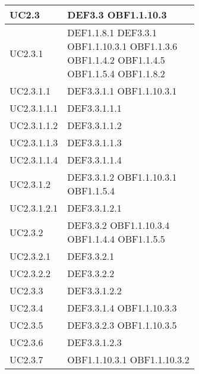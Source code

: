 \documentclass{scalatekids-article}
\begin{document}
\begin{longtable}[H]{|p{5.5cm}|p{5.5cm}|}
\hline
UC2.3 & \multiLineCell[t]{DEF3.3 OBF1.1.10.3\\}\\
\hline
UC2.3.1 & \multiLineCell[t]{DEF1.1.8.1 DEF3.3.1\\OBF1.1.10.3.1 OBF1.1.3.6\\OBF1.1.4.2 OBF1.1.4.5\\OBF1.1.5.4 OBF1.1.8.2\\}\\
\hline
UC2.3.1.1 & \multiLineCell[t]{DEF3.3.1.1 OBF1.1.10.3.1\\}\\
\hline
UC2.3.1.1.1 & \multiLineCell[t]{DEF3.3.1.1.1\\}\\
\hline
UC2.3.1.1.2 & \multiLineCell[t]{DEF3.3.1.1.2\\}\\
\hline
UC2.3.1.1.3 & \multiLineCell[t]{DEF3.3.1.1.3\\}\\
\hline
UC2.3.1.1.4 & \multiLineCell[t]{DEF3.3.1.1.4\\}\\
\hline
UC2.3.1.2 & \multiLineCell[t]{DEF3.3.1.2 OBF1.1.10.3.1\\OBF1.1.5.4}\\
\hline
UC2.3.1.2.1 & \multiLineCell[t]{DEF3.3.1.2.1\\}\\
\hline
UC2.3.2 & \multiLineCell[t]{DEF3.3.2 OBF1.1.10.3.4\\OBF1.1.4.4 OBF1.1.5.5\\}\\
\hline
UC2.3.2.1 & \multiLineCell[t]{DEF3.3.2.1\\}\\
\hline
UC2.3.2.2 & \multiLineCell[t]{DEF3.3.2.2\\}\\
\hline
UC2.3.3 & \multiLineCell[t]{DEF3.3.1.2.2\\}\\
\hline
UC2.3.4 & \multiLineCell[t]{DEF3.3.1.4 OBF1.1.10.3.3\\}\\
\hline
UC2.3.5 & \multiLineCell[t]{DEF3.3.2.3 OBF1.1.10.3.5\\}\\
\hline
UC2.3.6 & \multiLineCell[t]{DEF3.3.1.2.3\\}\\
\hline
UC2.3.7 & \multiLineCell[t]{OBF1.1.10.3.1 OBF1.1.10.3.2\\}\\

\end{longtable}
\end{document}
